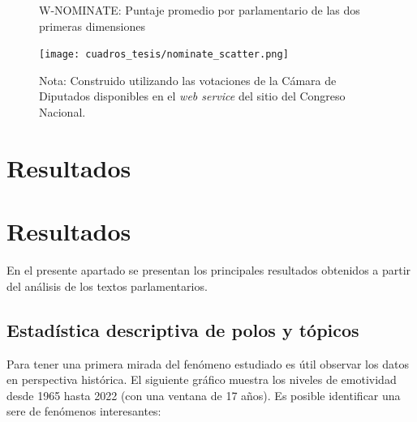 \documentclass[
  12pt,
]{article}
\begin{document}
\begin{figure}[H]
\centering
\large
\caption{W-NOMINATE: Puntaje promedio por parlamentario de las dos primeras dimensiones}
\label{w_nominate_scatter}
\texttt{[image: cuadros\_tesis/nominate\_scatter.png]}
     \caption*{\footnotesize{{Nota: Construido utilizando las votaciones de la Cámara de Diputados disponibles en el \textit{web service} del sitio del Congreso Nacional.} }}

\normalsize
\end{figure}

\pagebreak

\hypertarget{resultados}{%
\section{Resultados}\label{resultados}}

\hypertarget{resultados-1}{%
\section{Resultados}\label{resultados-1}}

En el presente apartado se presentan los principales resultados
obtenidos a partir del análisis de los textos parlamentarios.

\hypertarget{estaduxedstica-descriptiva-de-polos-y-tuxf3picos}{%
\subsection{Estadística descriptiva de polos y
tópicos}\label{estaduxedstica-descriptiva-de-polos-y-tuxf3picos}}

Para tener una primera mirada del fenómeno estudiado es útil observar
los datos en perspectiva histórica. El siguiente gráfico muestra los
niveles de emotividad desde 1965 hasta 2022 (con una ventana de 17
años). Es posible identificar una sere de fenómenos interesantes:
\end{document}
